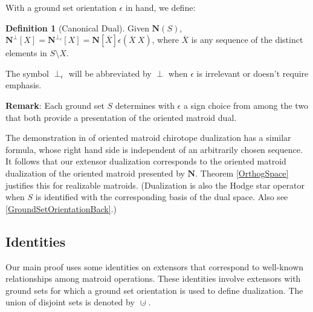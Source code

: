 \documentclass[12pt]{article}
\theoremstyle{definition}
\newtheorem{definition}[theorem]{Definition}
\newcommand{\Remark}{\textbf{Remark}}
\newcommand{\dunion}
{\mbox{\hbox{\hskip6pt$\cdot$\hskip-5.50pt$\cup$\hskip2pt}}}
\newcommand{\scomp}[1]{\ensuremath{\overline{#1}}}
\newcommand{\scma}{\ensuremath{\ }}
\newcommand{\ext}[1]{\ensuremath{\mathbf{#1}}}
\begin{document}
With a ground set orientation $\epsilon$ in hand, we define: 
\begin{definition}[Canonical Dual]
\label{definitionCanonicalDual}
Given $\ext{N}(S)$, 
$\ext{N}^\perp[X] = \ext{N}^{\perp_{\epsilon}}[X]=\ext{N}[\scomp{X}]\epsilon(\scomp{X}\scma X)$, where $\scomp{X}$ is any sequence of the distinct elements
in $S\setminus X$.

The symbol $\perp_{\epsilon}$ will be abbreviated by $\perp$ when 
$\epsilon$ is irrelevant or doesn't require emphasis.
\end{definition}


\Remark:
Each ground set $S$ determines with $\epsilon$ 
a sign choice from among the two 
that both provide a presentation of the
oriented matroid dual.


The demonstration in \cite[end of ]{OMBOOK}
of oriented matroid chirotope dualization 
has a similar formula, whose right hand side is
independent of an arbitrarily chosen sequence.  It follows that 
our extensor dualization corresponds to the oriented
matroid dualization of the oriented matroid presented by
$\ext{N}$.  Theorem \ref{OrthogSpace} justifies this for
realizable matroids.  (Dualization is also the Hodge star 
operator\cite{HodgePedoe1}
when $S$ is identified with the corresponding basis of the dual 
space. Also see \textsection\ref{GroundSetOrientationBack}.)

\subsection{Identities}
\label{IdentitiesSect}

Our main proof uses some identities on extensors 
that correspond to well-known relationships among matroid operations.
These identities involve extensors with ground sets
for which a ground set orientation is used to define dualization.
The union of disjoint sets is denoted by $\dunion$.
\end{document}
